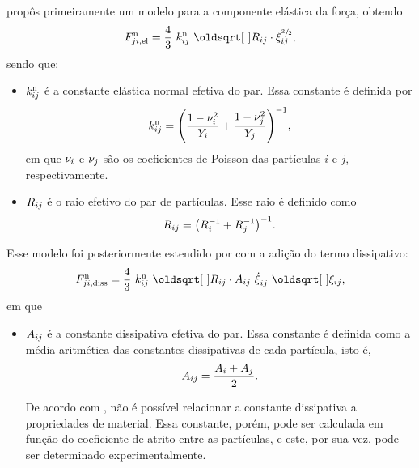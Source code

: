  propôs primeiramente um modelo para a componente elástica da força, obtendo
\begin{equation*}
	\normalElasticForceji = \dfrac{4}{3}\ \effectiveNormalElasticij\ \sqrt{\effectiveRadiusij}\cdot\overlapij^{\sfrac{3}{2}},
\end{equation*}
sendo que:
\begin{itemize}
	\item \({k}_{i j}^{\text{n}}\) é a constante elástica normal efetiva do par. Essa constante é definida por
		\begin{equation*}
			\effectiveNormalElasticij = \pqty{\dfrac{1-\poissoni^2}{\elasticModulusi} + \dfrac{1-\poissonj^2}{\elasticModulusj}}^{-1},
		\end{equation*}
		em que \({\nu}_{i}\) e \({\nu}_{j}\) são os coeficientes de Poisson das partículas \(i\) e \(j\), respectivamente.

	\item \({R}_{i j}\) é o raio efetivo do par de partículas. Esse raio é definido como
		\begin{equation*}
			\effectiveRadiusij = \pqty{\radiusi^{-1} + \radiusj^{-1}}^{-1}.
		\end{equation*}
\end{itemize}

Esse modelo foi posteriormente estendido por  com a adição do termo dissipativo:
\begin{equation*}
	\normalDissipativeForceji = \dfrac{4}{3}\ \effectiveNormalElasticij\ \sqrt{\effectiveRadiusij}\cdot \normalDissipativeConstantij\ \overlapDerivativeij\ \sqrt{\overlapij},
\end{equation*}
em que
\begin{itemize}
	\item \({A}_{i j}\) é a constante dissipativa efetiva do par. Essa constante é definida como a média aritmética das constantes dissipativas de cada partícula, isto é,
	\begin{equation*}
		{A}_{i j} = \dfrac{{A}_{i} + {A}_{j}}{2}.
	\end{equation*}

	De acordo com , não é possível relacionar a constante dissipativa a propriedades de material. Essa constante, porém, pode ser calculada em função do coeficiente de atrito entre as partículas, e este, por sua vez, pode ser determinado experimentalmente.
\end{itemize}

